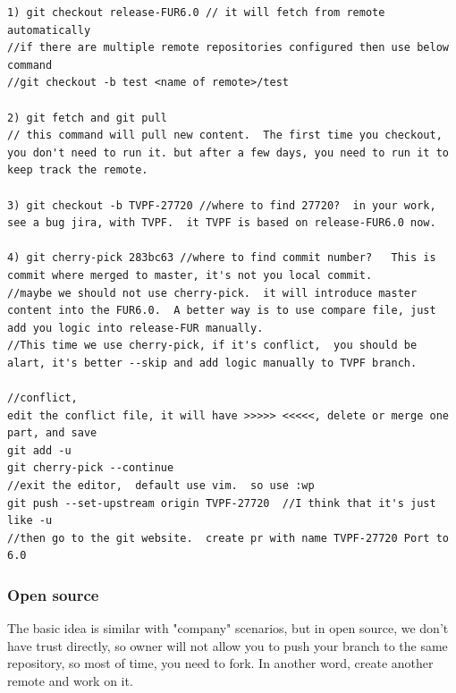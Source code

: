 \documentclass[a4paper,11pt,twoside]{book}
\begin{document}
\begin{lstlisting}
1) git checkout release-FUR6.0 // it will fetch from remote automatically
//if there are multiple remote repositories configured then use below command
//git checkout -b test <name of remote>/test

2) git fetch and git pull 
// this command will pull new content.  The first time you checkout, you don't need to run it. but after a few days, you need to run it to keep track the remote. 

3) git checkout -b TVPF-27720 //where to find 27720?  in your work, see a bug jira, with TVPF.  it TVPF is based on release-FUR6.0 now.

4) git cherry-pick 283bc63 //where to find commit number?   This is commit where merged to master, it's not you local commit.
//maybe we should not use cherry-pick.  it will introduce master content into the FUR6.0.  A better way is to use compare file, just add you logic into release-FUR manually. 
//This time we use cherry-pick, if it's conflict,  you should be alart, it's better --skip and add logic manually to TVPF branch.

//conflict, 
edit the conflict file, it will have >>>>> <<<<<, delete or merge one part, and save
git add -u
git cherry-pick --continue
//exit the editor,  default use vim.  so use :wp 
git push --set-upstream origin TVPF-27720  //I think that it's just like -u
//then go to the git website.  create pr with name TVPF-27720 Port to 6.0	
\end{lstlisting}


\subsubsection{Open source}

The basic idea is similar with "company" scenarios, but in open source, we don't have trust directly, so owner will not allow you to push your branch to the same repository,  so most of time, you need to fork.  In another word,  create another remote and work on it.
\end{document}
